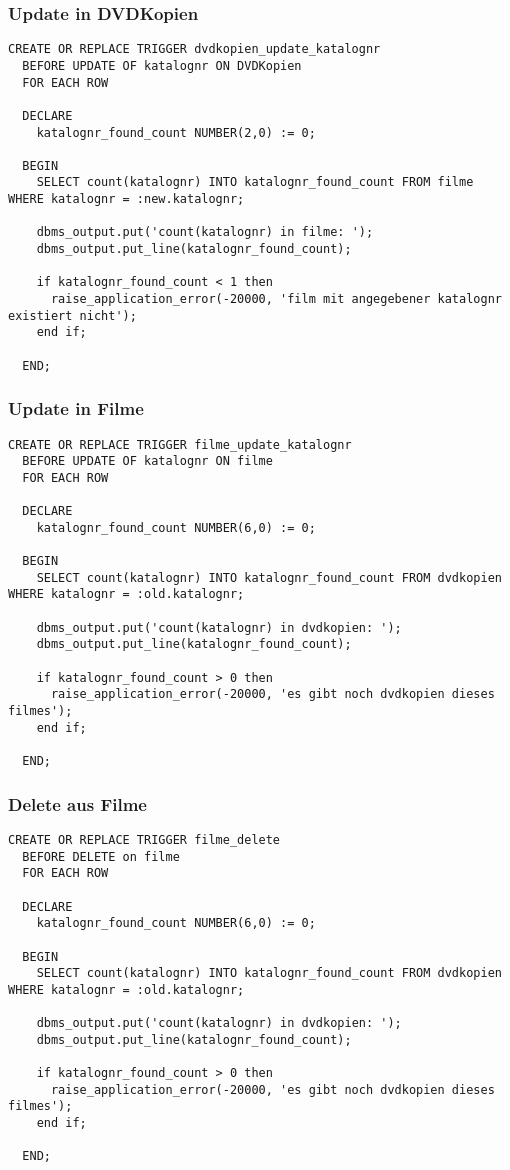 \documentclass[11pt,a4paper,parskip=half]{scrartcl}
\begin{document}
\subsubsection{Update in DVDKopien}
\begin{lstlisting}
CREATE OR REPLACE TRIGGER dvdkopien_update_katalognr
  BEFORE UPDATE OF katalognr ON DVDKopien
  FOR EACH ROW
  
  DECLARE
    katalognr_found_count NUMBER(2,0) := 0;
    
  BEGIN
    SELECT count(katalognr) INTO katalognr_found_count FROM filme WHERE katalognr = :new.katalognr;
    
    dbms_output.put('count(katalognr) in filme: ');
    dbms_output.put_line(katalognr_found_count);
    
    if katalognr_found_count < 1 then
      raise_application_error(-20000, 'film mit angegebener katalognr existiert nicht');
    end if;
    
  END;
\end{lstlisting}

\subsubsection{Update in Filme}
\begin{lstlisting}
CREATE OR REPLACE TRIGGER filme_update_katalognr
  BEFORE UPDATE OF katalognr ON filme
  FOR EACH ROW
  
  DECLARE
    katalognr_found_count NUMBER(6,0) := 0;
    
  BEGIN
    SELECT count(katalognr) INTO katalognr_found_count FROM dvdkopien WHERE katalognr = :old.katalognr;
    
    dbms_output.put('count(katalognr) in dvdkopien: ');
    dbms_output.put_line(katalognr_found_count);
    
    if katalognr_found_count > 0 then
      raise_application_error(-20000, 'es gibt noch dvdkopien dieses filmes');
    end if;
    
  END;
\end{lstlisting}

\subsubsection{Delete aus Filme}
\begin{lstlisting}
CREATE OR REPLACE TRIGGER filme_delete
  BEFORE DELETE on filme
  FOR EACH ROW
  
  DECLARE
    katalognr_found_count NUMBER(6,0) := 0;
    
  BEGIN
    SELECT count(katalognr) INTO katalognr_found_count FROM dvdkopien WHERE katalognr = :old.katalognr;
    
    dbms_output.put('count(katalognr) in dvdkopien: ');
    dbms_output.put_line(katalognr_found_count);
    
    if katalognr_found_count > 0 then
      raise_application_error(-20000, 'es gibt noch dvdkopien dieses filmes');
    end if;
    
  END;
\end{lstlisting}
\end{document}
